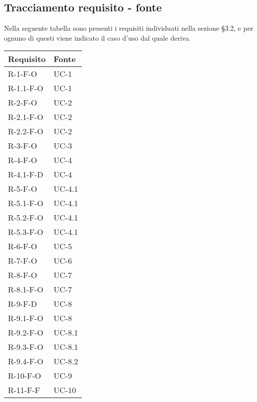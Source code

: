 \subsection{Tracciamento requisito - fonte}\label{subsec:tracciamento-requisiti---fonte}
Nella seguente tabella sono presenti i requisiti individuati nella sezione \S3.2, e per ognuno di questi viene indicato il caso d'uso dal quale deriva.
\begin{longtable}{| C{6cm} |C{6cm}|}
    \hline
    \textbf{Requisito} & \textbf{Fonte}  \\\hline
    R-1-F-O            & UC-1            \\\hline
    R-1.1-F-O          & UC-1            \\\hline
    R-2-F-O            & UC-2            \\\hline
    R-2.1-F-O          & UC-2            \\\hline
    R-2.2-F-O          & UC-2            \\\hline
    R-3-F-O            & UC-3            \\\hline
    R-4-F-O            & UC-4            \\\hline
    R-4.1-F-D          & UC-4            \\\hline
    R-5-F-O            & UC-4.1          \\\hline
    R-5.1-F-O          & UC-4.1          \\\hline
    R-5.2-F-O          & UC-4.1          \\\hline
    R-5.3-F-O          & UC-4.1          \\\hline
    R-6-F-O            & UC-5            \\\hline
    R-7-F-O            & UC-6            \\\hline
    R-8-F-O            & UC-7            \\\hline
    R-8.1-F-O          & UC-7            \\\hline
    R-9-F-D            & UC-8            \\\hline
    R-9.1-F-O          & UC-8            \\\hline
    R-9.2-F-O          & UC-8.1          \\\hline
    R-9.3-F-O          & UC-8.1          \\\hline
    R-9.4-F-O          & UC-8.2          \\\hline
    R-10-F-O           & UC-9            \\\hline
    R-11-F-F           & UC-10           \\\hline

\end{longtable}

